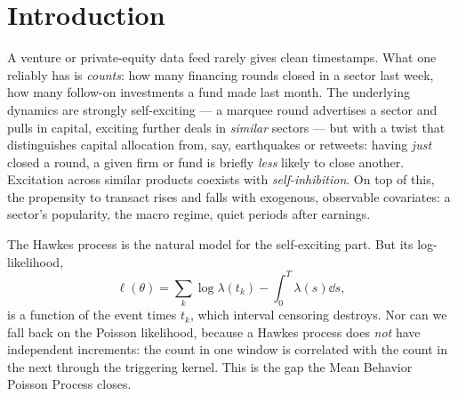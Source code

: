 \documentclass[11pt]{article}
\theoremstyle{plain}
\theoremstyle{definition}
\theoremstyle{remark}
\begin{document}
\tableofcontents
\bigskip

\section{Introduction}
\label{sec:intro}

A venture or private-equity data feed rarely gives clean timestamps. What one
reliably has is \emph{counts}: how many financing rounds closed in a sector last
week, how many follow-on investments a fund made last month. The underlying
dynamics are strongly self-exciting --- a marquee round advertises a sector and
pulls in capital, exciting further deals in \emph{similar} sectors --- but with a
twist that distinguishes capital allocation from, say, earthquakes or retweets:
having \emph{just} closed a round, a given firm or fund is briefly
\emph{less} likely to close another. Excitation across similar products coexists
with \emph{self-inhibition}. On top of this, the propensity to transact rises and
falls with exogenous, observable covariates: a sector's popularity, the macro
regime, quiet periods after earnings.

The Hawkes process is the natural model for the self-exciting part. But its
log-likelihood,
\[
\ell(\theta) = \sum_{k}\log\lambda(t_k) - \int_0^T\lambda(s)\dd s,
\]
is a function of the event times $t_k$, which interval censoring destroys. Nor can
we fall back on the Poisson likelihood, because a Hawkes process does \emph{not}
have independent increments: the count in one window is correlated with the count
in the next through the triggering kernel. This is the gap the Mean Behavior
Poisson Process closes.
\end{document}
